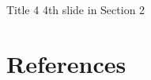 \documentclass{beamer}
\begin{document}
\begin{frame}{Title 4}
    4th slide in Section 2
\end{frame}

\section{References}

\begin{frame}[allowframebreaks]
    
    
    \nocite{*} %
\end{frame}

\end{document}
